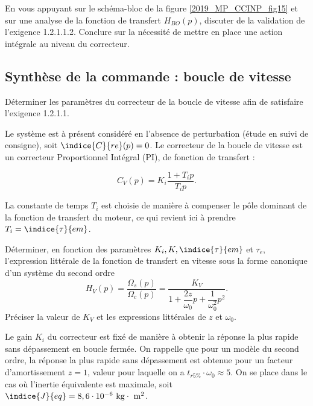 \begin{question}
En vous appuyant sur le schéma-bloc de la figure \ref{2019_MP_CCINP_fig15} et sur une analyse de la fonction de transfert $H_{B O}(p)$, discuter de la validation de l'exigence 1.2.1.1.2. Conclure sur la nécessité de mettre en place une action intégrale au niveau du correcteur.
\end{question}

  
  
\subsection{Synthèse de la commande : boucle de vitesse}
\begin{obj}
Déterminer les paramètres du correcteur de la boucle de vitesse afin de satisfaire l'exigence 1.2.1.1.
\end{obj}
Le système est à présent considéré en l'absence de perturbation (étude en suivi de consigne), soit $\indice{C}{re}(p)=0$. Le correcteur de la boucle de vitesse est un correcteur Proportionnel Intégral (PI), de fonction de transfert :

$$
C_{V}(p)=K_{i} \dfrac{1+T_{i} p}{T_{i} p} .
$$

La constante de temps $T_{i}$ est choisie de manière à compenser le pôle dominant de la fonction de transfert du moteur, ce qui revient ici à prendre $T_{i}=\indice{\tau}{em}$.



\begin{question}
Déterminer, en fonction des paramètres $K_{i}, K, \indice{\tau}{em}$ et $\tau_{e}$, l'expression littérale de la fonction de transfert en vitesse sous la forme canonique d'un système du second ordre
$$
H_{V}(p)=\dfrac{\Omega_{s}(p)}{\Omega_{c}(p)}=\dfrac{K_{V}}{1+\dfrac{2 z}{\omega_{0}} p+\dfrac{1}{\omega_{0}^{2}} p^{2}} .
$$
Préciser la valeur de $K_{V}$ et les expressions littérales de $z$ et $\omega_{0}$.
\end{question}



Le gain $K_{i}$ du correcteur est fixé de manière à obtenir la réponse la plus rapide sans dépassement en boucle fermée. On rappelle que pour un modèle du second ordre, la réponse la plus rapide sans dépassement est obtenue pour un facteur d'amortissement $z=1$, valeur pour laquelle on a $t_{r 5 \%} \cdot \omega_{0} \approx 5$. On se place dans le cas où l'inertie équivalente est maximale, soit $\indice{J}{eq}=8,6 \cdot 10^{-6} \mathrm{~kg} \cdot \mathrm{~m}^{2}$.

